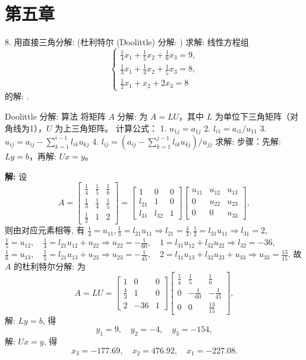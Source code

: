 \documentclass[a4paper,11pt]{ctexart}
\begin{document}
\newpage

\section{第五章}

8. 用直接三角分解:  (杜利特尔 (Doolittle) 分解: ) 求解: 线性方程组
\[
\begin{cases}
\frac{1}{4}x_1 + \frac{1}{5}x_2 + \frac{1}{6}x_3 = 9, \\
\frac{1}{3}x_1 + \frac{1}{4}x_2 + \frac{1}{5}x_3 = 8, \\
\frac{1}{2}x_1 + x_2 + 2x_3 = 8
\end{cases}
\]
的解: .

\begin{theorybox}{Doolittle 分解: 算法}
将矩阵 $A$ 分解: 为 $A = LU$，其中 $L$ 为单位下三角矩阵（对角线为1），$U$ 为上三角矩阵。
计算公式：
1. $u_{1j} = a_{1j}$
2. $l_{i1} = a_{i1}/u_{11}$
3. $u_{ij} = a_{ij} - \sum_{k=1}^{i-1} l_{ik}u_{kj}$
4. $l_{ij} = (a_{ij} - \sum_{k=1}^{j-1} l_{ik}u_{kj}) / u_{jj}$
求解: 步骤：先解:  $Ly=b$，再解:  $Ux=y$。
\end{theorybox}

\textbf{解: } 设
\[
A = \begin{bmatrix}
\frac{1}{4} & \frac{1}{5} & \frac{1}{6} \\
\frac{1}{3} & \frac{1}{4} & \frac{1}{5} \\
\frac{1}{2} & 1 & 2
\end{bmatrix} =
\begin{bmatrix}
1 & 0 & 0 \\
l_{21} & 1 & 0 \\
l_{31} & l_{32} & 1
\end{bmatrix}
\begin{bmatrix}
u_{11} & u_{12} & u_{13} \\
0 & u_{22} & u_{23} \\
0 & 0 & u_{33}
\end{bmatrix},
\]
则由对应元素相等, 有 $\frac{1}{4} = u_{11}, \frac{1}{3} = l_{21}u_{11} \Rightarrow l_{21} = \frac{4}{3}, \frac{1}{2} = l_{31}u_{11} \Rightarrow l_{31} = 2$,
$\frac{1}{5} = u_{12}, \quad \frac{1}{4} = l_{21}u_{12} + u_{22} \Rightarrow u_{22} = -\frac{1}{60}, \quad 1 = l_{31}u_{12} + l_{32}u_{22} \Rightarrow l_{32} = -36$,
$\frac{1}{6} = u_{13}, \quad \frac{1}{5} = l_{21}u_{13} + u_{23} \Rightarrow u_{23} = -\frac{1}{45}, \quad 2 = l_{31}u_{13} + l_{32}u_{23} + u_{33} \Rightarrow u_{33} = \frac{13}{15}$.
故 $A$ 的杜利特尔分解: 为
\[
A = LU = \begin{bmatrix}
1 & 0 & 0 \\
\frac{4}{3} & 1 & 0 \\
2 & -36 & 1
\end{bmatrix}
\begin{bmatrix}
\frac{1}{4} & \frac{1}{5} & \frac{1}{6} \\
0 & -\frac{1}{60} & -\frac{1}{45} \\
0 & 0 & \frac{13}{15}
\end{bmatrix},
\]
解:  $Ly=b$, 得
\[
y_1 = 9, \quad y_2 = -4, \quad y_3 = -154,
\]
解:  $Ux=y$, 得
\[
x_3 = -177.69, \quad x_2 = 476.92, \quad x_1 = -227.08.
\]
\end{document}
